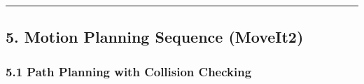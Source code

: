 \documentclass[
]{article}
\begin{document}
\begin{center}\rule{0.5\linewidth}{0.5pt}\end{center}

\hypertarget{motion-planning-sequence-moveit2}{%
\subsection{5. Motion Planning Sequence
(MoveIt2)}\label{motion-planning-sequence-moveit2}}

\hypertarget{path-planning-with-collision-checking}{%
\subsubsection{5.1 Path Planning with Collision
Checking}\label{path-planning-with-collision-checking}}
\end{document}
